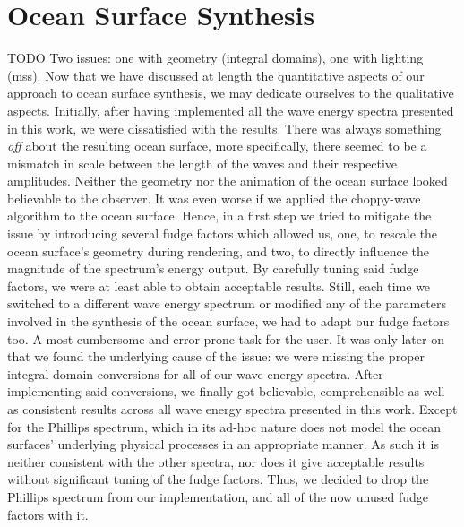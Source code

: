 \section{Ocean Surface Synthesis}
\label{sec:results:synthesis}
TODO Two issues: one with geometry (integral domains), one with lighting (mss).
Now that we have discussed at length the quantitative aspects of our approach
to ocean surface synthesis, we may dedicate ourselves to the qualitative aspects.
Initially, after having implemented all the wave energy
spectra presented in this work, we were dissatisfied with the results.
There was always something \emph{off} about the resulting ocean surface, more
specifically, there seemed to be a mismatch in scale between the length of the
waves and their respective amplitudes. Neither the geometry nor the animation of
the ocean surface looked believable to the observer. It was even worse if we
applied the choppy-wave algorithm to the ocean surface. Hence, in a first step we
tried to mitigate the issue by introducing several fudge factors which allowed
us, one, to rescale the ocean surface's geometry during rendering, and two,
to directly influence the magnitude of the spectrum's energy output. 
By carefully tuning said fudge factors, we were at least able to obtain
acceptable results. Still, each time we switched to a different wave energy
spectrum or modified any of the parameters involved
in the synthesis of the ocean surface, we had to adapt our fudge factors too.
A most cumbersome and error-prone task for the user.
It was only later on that we found the underlying cause of the issue:
we were missing the proper integral domain conversions for all of our wave energy
spectra. After implementing said conversions,
we finally got believable, comprehensible as well as consistent results across
all wave energy spectra presented in this work. Except for the Phillips
spectrum, which in its ad-hoc nature does not model the ocean surfaces'
underlying physical processes in an appropriate manner. As such it is neither
consistent with the other spectra, nor does it give acceptable results without
significant tuning of the fudge factors. Thus, we decided to drop the Phillips
spectrum from our implementation, and all of the now unused fudge factors with it.



